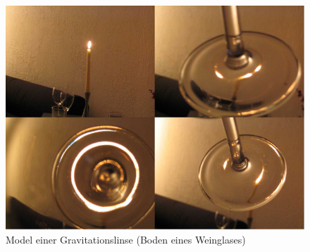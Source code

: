 \begin{refsection}
\begin{figure}
  \centering
  \includegraphics[width=\textwidth]{cluster/images/model_grav_lens}
  \caption{Model einer Gravitationslinse (Boden eines Weinglases)
    \cite{standford:ModelGravLens}}
  \label{fig:ModelGravLinse}
\end{figure}

\printbibliography[heading=subbibliography]
\end{refsection}

